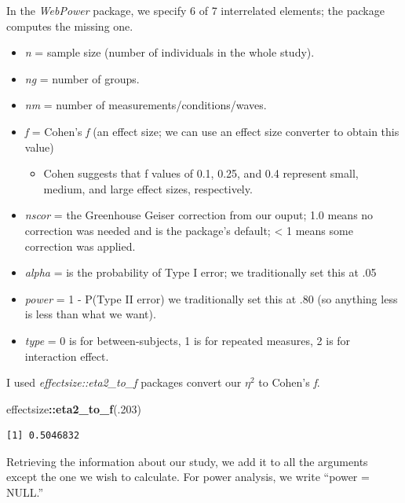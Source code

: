 \documentclass[
  11pt,
]{book}
\newenvironment{Shaded}{\begin{snugshade}}{\end{snugshade}}
\newcommand{\DecValTok}[1]{\textcolor[rgb]{0.06,0.06,0.06}{#1}}
\newcommand{\FunctionTok}[1]{\textcolor[rgb]{0.27,0.27,0.27}{\textbf{#1}}}
\newcommand{\NormalTok}[1]{#1}
\newcommand{\SpecialCharTok}[1]{\textcolor[rgb]{0.43,0.43,0.43}{\textbf{#1}}}
\providecommand{\tightlist}{%
  \setlength{\itemsep}{0pt}\setlength{\parskip}{0pt}}
\begin{document}
In the \emph{WebPower} package, we specify 6 of 7 interrelated elements; the package computes the missing one.

\begin{itemize}
\tightlist
\item
  \emph{n} = sample size (number of individuals in the whole study).
\item
  \emph{ng} = number of groups.
\item
  \emph{nm} = number of measurements/conditions/waves.
\item
  \emph{f} = Cohen's \emph{f} (an effect size; we can use an effect size converter to obtain this value)

  \begin{itemize}
  \tightlist
  \item
    Cohen suggests that f values of 0.1, 0.25, and 0.4 represent small, medium, and large effect sizes, respectively.
  \end{itemize}
\item
  \emph{nscor} = the Greenhouse Geiser correction from our ouput; 1.0 means no correction was needed and is the package's default; \textless{} 1 means some correction was applied.
\item
  \emph{alpha} = is the probability of Type I error; we traditionally set this at .05
\item
  \emph{power} = 1 - P(Type II error) we traditionally set this at .80 (so anything less is less than what we want).
\item
  \emph{type} = 0 is for between-subjects, 1 is for repeated measures, 2 is for interaction effect.
\end{itemize}

I used \emph{effectsize::eta2\_to\_f} packages convert our \(\eta^2\) to Cohen's \emph{f}.

\begin{Shaded}
\begin{Highlighting}[]
\NormalTok{effectsize}\SpecialCharTok{::}\FunctionTok{eta2\_to\_f}\NormalTok{(.}\DecValTok{203}\NormalTok{) }
\end{Highlighting}
\end{Shaded}

\begin{verbatim}
[1] 0.5046832
\end{verbatim}

Retrieving the information about our study, we add it to all the arguments except the one we wish to calculate. For power analysis, we write ``power = NULL.''
\end{document}
